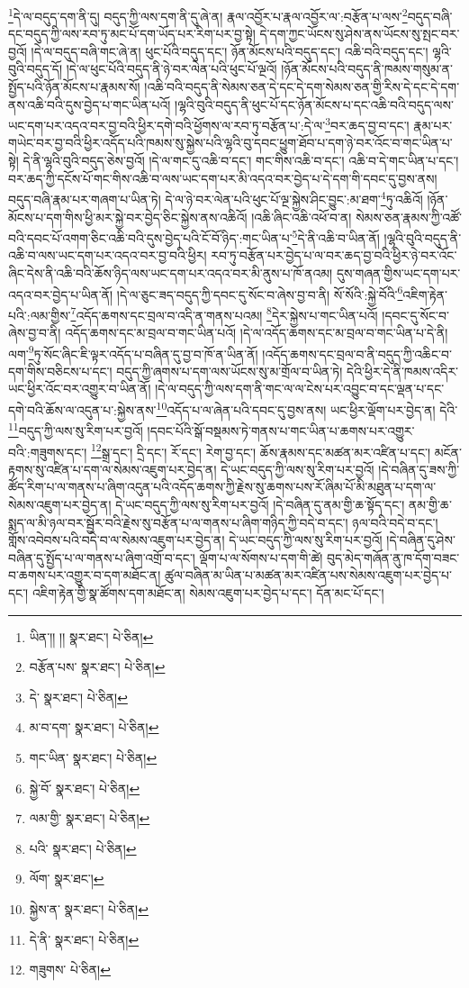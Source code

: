 \footnote{ཡིན་།། །།  སྣར་ཐང་།  པེ་ཅིན། }དེ་ལ་བདུད་དག་ནི་དུ། བདུད་ཀྱི་ལས་དག་ནི་དུ་ཞེ་ན། རྣལ་འབྱོར་པ་རྣལ་འབྱོར་ལ་:བརྩོན་པ་ལས་\footnote{བརྩོན་པས་  སྣར་ཐང་།  པེ་ཅིན། }བདུད་བཞི་དང་བདུད་ཀྱི་ལས་རབ་ཏུ་མང་པོ་དག་ཡོད་པར་རིག་པར་བྱ་སྟེ། དེ་དག་ཀྱང་ཡོངས་སུ་ཤེས་ནས་ཡོངས་སུ་སྤང་བར་བྱའོ། །དེ་ལ་བདུད་བཞི་གང་ཞེ་ན། ཕུང་པོའི་བདུད་དང་། ཉོན་མོངས་པའི་བདུད་དང་། འཆི་བའི་བདུད་དང་། ལྷའི་བུའི་བདུད་དོ། །དེ་ལ་ཕུང་པོའི་བདུད་ནི་ཉེ་བར་ལེན་པའི་ཕུང་པོ་ལྔའོ། །ཉོན་མོངས་པའི་བདུད་ནི་ཁམས་གསུམ་ན་སྤྱོད་པའི་ཉོན་མོངས་པ་རྣམས་སོ། །འཆི་བའི་བདུད་ནི་སེམས་ཅན་དེ་དང་དེ་དག་སེམས་ཅན་གྱི་རིས་དེ་དང་དེ་དག་ནས་འཆི་བའི་དུས་བྱེད་པ་གང་ཡིན་པའོ། །ལྷའི་བུའི་བདུད་ནི་ཕུང་པོ་དང་ཉོན་མོངས་པ་དང་འཆི་བའི་བདུད་ལས་ཡང་དག་པར་འདའ་བར་བྱ་བའི་ཕྱིར་དགེ་བའི་ཕྱོགས་ལ་རབ་ཏུ་བརྩོན་པ་:དེ་ལ་\footnote{དེ་  སྣར་ཐང་།  པེ་ཅིན། }བར་ཆད་བྱ་བ་དང་། རྣམ་པར་གཡེང་བར་བྱ་བའི་ཕྱིར་འདོད་པའི་ཁམས་སུ་སྐྱེས་པའི་ལྷའི་བུ་དབང་ཕྱུག་ཐོབ་པ་དག་ཉེ་བར་འོང་བ་གང་ཡིན་པ་སྟེ། དེ་ནི་ལྷའི་བུའི་བདུད་ཅེས་བྱའོ། །དེ་ལ་གང་དུ་འཆི་བ་དང་། གང་གིས་འཆི་བ་དང་། འཆི་བ་དེ་གང་ཡིན་པ་དང་། བར་ཆད་ཀྱི་དངོས་པོ་གང་གིས་འཆི་བ་ལས་ཡང་དག་པར་མི་འདའ་བར་བྱེད་པ་དེ་དག་གི་དབང་དུ་བྱས་ནས། བདུད་བཞི་རྣམ་པར་གཞག་པ་ཡིན་ཏེ། དེ་ལ་ཉེ་བར་ལེན་པའི་ཕུང་པོ་ལྔ་སྐྱེས་ཤིང་བྱུང་:མ་ཐག་\footnote{མ་བ་དག་  སྣར་ཐང་།  པེ་ཅིན། }ཏུ་འཆིའོ། །ཉོན་མོངས་པ་དག་གིས་ཕྱི་མར་སྐྱེ་བར་བྱེད་ཅིང་སྐྱེས་ནས་འཆིའོ། །འཆི་ཞིང་འཆི་འཕོ་བ་ན། སེམས་ཅན་རྣམས་ཀྱི་འཚོ་བའི་དབང་པོ་འགག་ཅིང་འཆི་བའི་དུས་བྱེད་པའི་ངོ་བོ་ཉིད་:གང་ཡིན་པ་\footnote{གང་ཡིན་  སྣར་ཐང་།  པེ་ཅིན། }དེ་ནི་འཆི་བ་ཡིན་ནོ། །ལྷའི་བུའི་བདུད་ནི་འཆི་བ་ལས་ཡང་དག་པར་འདའ་བར་བྱ་བའི་ཕྱིར། རབ་ཏུ་བརྩོན་པར་བྱེད་པ་ལ་བར་ཆད་བྱ་བའི་ཕྱིར་ཉེ་བར་འོང་ཞིང་དེས་ནི་འཆི་བའི་ཆོས་ཉིད་ལས་ཡང་དག་པར་འདའ་བར་མི་ནུས་པ་ཁོ་ནའམ། དུས་གཞན་གྱིས་ཡང་དག་པར་འདའ་བར་བྱེད་པ་ཡིན་ནོ། །དེ་ལ་ཅུང་ཟད་བདུད་ཀྱི་དབང་དུ་སོང་བ་ཞེས་བྱ་བ་ནི། སོ་སོའི་:སྐྱེ་བོའི་\footnote{སྐྱེ་བོ་  སྣར་ཐང་།  པེ་ཅིན། }འཇིག་རྟེན་པའི་:ལམ་གྱིས་\footnote{ལམ་གྱི་  སྣར་ཐང་།  པེ་ཅིན། }འདོད་ཆགས་དང་བྲལ་བ་འདི་ན་གནས་པའམ། \footnote{པའི་  སྣར་ཐང་།  པེ་ཅིན། }དེར་སྐྱེས་པ་གང་ཡིན་པའོ། །དབང་དུ་སོང་བ་ཞེས་བྱ་བ་ནི། འདོད་ཆགས་དང་མ་བྲལ་བ་གང་ཡིན་པའོ། །དེ་ལ་འདོད་ཆགས་དང་མ་བྲལ་བ་གང་ཡིན་པ་དེ་ནི། ལག་\footnote{ལོག་  སྣར་ཐང་། }ཏུ་སོང་ཞིང་ཇི་ལྟར་འདོད་པ་བཞིན་དུ་བྱ་བ་ཁོ་ན་ཡིན་ནོ། །འདོད་ཆགས་དང་བྲལ་བ་ནི་བདུད་ཀྱི་འཆིང་བ་དག་གིས་བཅིངས་པ་དང་། བདུད་ཀྱི་ཞགས་པ་དག་ལས་ཡོངས་སུ་མ་གྲོལ་བ་ཡིན་ཏེ། དེའི་ཕྱིར་དེ་ནི་ཁམས་འདིར་ཡང་ཕྱིར་འོང་བར་འགྱུར་བ་ཡིན་ནོ། །དེ་ལ་བདུད་ཀྱི་ལས་དག་ནི་གང་ལ་ལ་ངེས་པར་འབྱུང་བ་དང་ལྡན་པ་དང་དགེ་བའི་ཆོས་ལ་འདུན་པ་:སྐྱེས་ནས་\footnote{སྐྱེས་ན་  སྣར་ཐང་།  པེ་ཅིན། }འདོད་པ་ལ་ཞེན་པའི་དབང་དུ་བྱས་ནས། ཡང་ཕྱིར་ལྡོག་པར་བྱེད་ན། དེའི་\footnote{དེ་ནི་  སྣར་ཐང་།  པེ་ཅིན། }བདུད་ཀྱི་ལས་སུ་རིག་པར་བྱའོ། །དབང་པོའི་སྒོ་བསྡམས་ཏེ་གནས་པ་གང་ཡིན་པ་ཆགས་པར་འགྱུར་བའི་:གཟུགས་དང་། \footnote{གཟུགས་  པེ་ཅིན། }སྒྲ་དང་། དྲི་དང་། རོ་དང་། རེག་བྱ་དང་། ཆོས་རྣམས་དང་མཚན་མར་འཛིན་པ་དང་། མངོན་རྟགས་སུ་འཛིན་པ་དག་ལ་སེམས་འཇུག་པར་བྱེད་ན། དེ་ཡང་བདུད་ཀྱི་ལས་སུ་རིག་པར་བྱའོ། །དེ་བཞིན་དུ་ཟས་ཀྱི་ཚོད་རིག་པ་ལ་གནས་པ་ཞིག་འདུན་པའི་འདོད་ཆགས་ཀྱི་རྗེས་སུ་ཆགས་པས་རོ་ཞིམ་པོ་མི་མཐུན་པ་དག་ལ་སེམས་འཇུག་པར་བྱེད་ན། དེ་ཡང་བདུད་ཀྱི་ལས་སུ་རིག་པར་བྱའོ། །དེ་བཞིན་དུ་ནམ་གྱི་ཆ་སྟོད་དང་། ནམ་གྱི་ཆ་སྨད་ལ་མི་ཉལ་བར་སྦྱོར་བའི་རྗེས་སུ་བརྩོན་པ་ལ་གནས་པ་ཞིག་གཉིད་ཀྱི་བདེ་བ་དང་། ཉལ་བའི་བདེ་བ་དང་། གློས་འབེབས་པའི་བདེ་བ་ལ་སེམས་འཇུག་པར་བྱེད་ན། དེ་ཡང་བདུད་ཀྱི་ལས་སུ་རིག་པར་བྱའོ། །དེ་བཞིན་དུ་ཤེས་བཞིན་དུ་སྤྱོད་པ་ལ་གནས་པ་ཞིག་འགྲོ་བ་དང་། ལྡོག་པ་ལ་སོགས་པ་དག་གི་ཚེ། བུད་མེད་གཞོན་ནུ་ཁ་དོག་བཟང་བ་ཆགས་པར་འགྱུར་བ་དག་མཐོང་ན། ཚུལ་བཞིན་མ་ཡིན་པ་མཚན་མར་འཛིན་པས་སེམས་འཇུག་པར་བྱེད་པ་དང་། འཇིག་རྟེན་གྱི་སྣ་ཚོགས་དག་མཐོང་ན། སེམས་འཇུག་པར་བྱེད་པ་དང་། དོན་མང་པོ་དང་། 